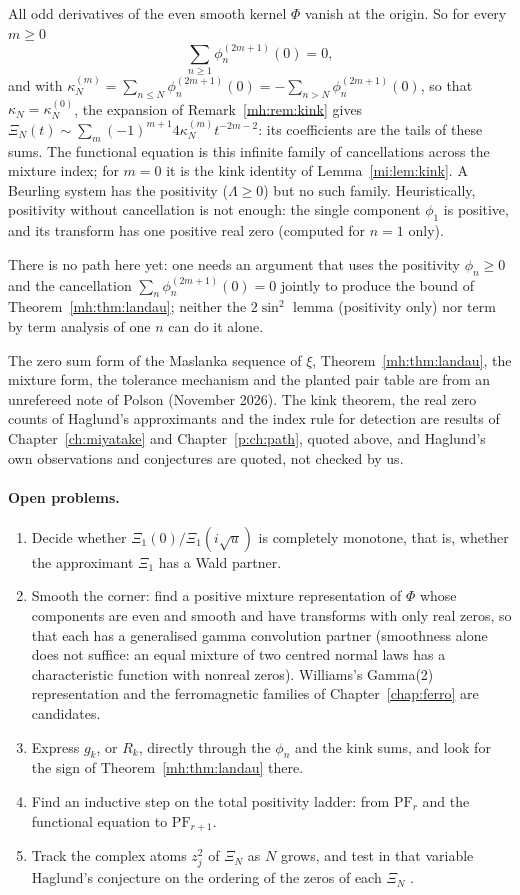 All odd derivatives of the even smooth kernel $\Phi$ vanish at the origin. So for every $m\ge0$
\[
\sum_{n\ge1}\phi_n^{(2m+1)}(0)=0,
\]
and with $\kappa_N^{(m)}=\sum_{n\le N}\phi_n^{(2m+1)}(0)=-\sum_{n>N}\phi_n^{(2m+1)}(0)$, so that $\kappa_N=\kappa_N^{(0)}$, the expansion of Remark~\ref{mh:rem:kink} gives $\Xi_N(t)\sim\sum_m(-1)^{m+1}4\kappa_N^{(m)}t^{-2m-2}$: its coefficients are the tails of these sums. The functional equation is this infinite family of cancellations across the mixture index; for $m=0$ it is the kink identity of Lemma~\ref{mi:lem:kink}. A Beurling system has the positivity ($\Lambda\ge0$) but no such family. Heuristically, positivity without cancellation is not enough: the single component $\phi_1$ is positive, and its transform has one positive real zero (computed for $n=1$ only).

There is no path here yet: one needs an argument that uses the positivity $\phi_n\ge0$ and the cancellation $\sum_n\phi_n^{(2m+1)}(0)=0$ jointly to produce the bound of Theorem~\ref{mh:thm:landau}; neither the $2\sin^2$ lemma (positivity only) nor term by term analysis of one $n$ can do it alone.

The zero sum form of the Maslanka sequence of $\xi$, Theorem~\ref{mh:thm:landau}, the mixture form, the tolerance mechanism and the planted pair table are from an unrefereed note of Polson (November 2026). The kink theorem, the real zero counts of Haglund's approximants and the index rule for detection are results of Chapter~\ref{ch:miyatake} and Chapter~\ref{p:ch:path}, quoted above, and Haglund's own observations and conjectures \cite{Haglund09} are quoted, not checked by us.

\paragraph{Open problems.}
\begin{enumerate}
\item Decide whether $\Xi_1(0)/\Xi_1(i\sqrt u)$ is completely monotone, that is, whether the approximant $\Xi_1$ has a Wald partner.
\item Smooth the corner: find a positive mixture representation of $\Phi$ whose components are even and smooth and have transforms with only real zeros, so that each has a generalised gamma convolution partner (smoothness alone does not suffice: an equal mixture of two centred normal laws has a characteristic function with nonreal zeros). Williams's Gamma(2) representation and the ferromagnetic families of Chapter~\ref{chap:ferro} are candidates.
\item Express $g_k$, or $R_k$, directly through the $\phi_n$ and the kink sums, and look for the sign of Theorem~\ref{mh:thm:landau} there.
\item Find an inductive step on the total positivity ladder: from $\mathrm{PF}_r$ and the functional equation to $\mathrm{PF}_{r+1}$.
\item Track the complex atoms $z_j^2$ of $\Xi_N$ as $N$ grows, and test in that variable Haglund's conjecture on the ordering of the zeros of each $\Xi_N$ \cite{Haglund09}.
\end{enumerate}
